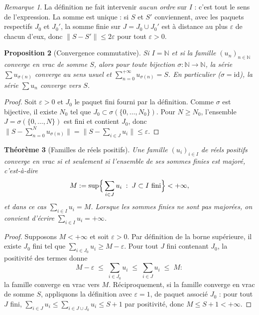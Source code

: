 \documentclass[11pt,a4paper]{article}
\theoremstyle{plain}
\newtheorem{theoreme}{Théorème}[section]
\newtheorem{proposition}[theoreme]{Proposition}
\theoremstyle{definition}
\theoremstyle{remark}
\newtheorem{remarque}[theoreme]{Remarque}
\newcommand{\N}{\mathbb{N}}
\newcommand{\eps}{\varepsilon}
\numberwithin{equation}{section}
\begin{document}
\begin{remarque}
La définition ne fait intervenir \emph{aucun ordre} sur $I$ : c'est tout le
sens de l'expression. La somme est unique : si $S$ et $S'$ conviennent,
avec les paquets respectifs $J_0$ et $J_0'$, la somme finie sur
$J=J_0\cup J_0'$ est à distance au plus $\eps$ de chacun d'eux, donc
$\lVert S-S'\rVert\leq 2\eps$ pour tout $\eps>0$.
\end{remarque}

\begin{proposition}[Convergence commutative]\label{prop:commutative}
Si $I=\N$ et si la famille $(u_n)_{n\in\N}$ converge en vrac de somme $S$,
alors pour \emph{toute} bijection $\sigma:\N\to\N$, la série
$\sum u_{\sigma(n)}$ converge au sens usuel et
$\sum_{n=0}^{+\infty}u_{\sigma(n)}=S$. En particulier
($\sigma=\mathrm{id}$), la série $\sum u_n$ converge vers $S$.
\end{proposition}

\begin{proof}
Soit $\eps>0$ et $J_0$ le paquet fini fourni par la définition. Comme
$\sigma$ est bijective, il existe $N_0$ tel que
$J_0\subset\sigma(\{0,\dots,N_0\})$. Pour $N\geq N_0$, l'ensemble
$J=\sigma(\{0,\dots,N\})$ est fini et contient $J_0$, donc
$\bigl\lVert S-\sum_{n=0}^{N}u_{\sigma(n)}\bigr\rVert
=\bigl\lVert S-\sum_{i\in J}u_i\bigr\rVert\leq\eps$.
\end{proof}

\begin{theoreme}[Familles de réels positifs]\label{thm:vrac-positif}
Une famille $(u_i)_{i\in I}$ de réels \emph{positifs} converge en vrac si
et seulement si l'ensemble de ses sommes finies est majoré, c'est-à-dire
\[
M:=\sup\Bigl\{\,\sum_{i\in J}u_i \;:\; J\subset I \text{ fini}\Bigr\}
<+\infty ,
\]
et dans ce cas $\sum_{i\in I}u_i=M$. Lorsque les sommes finies ne sont pas
majorées, on convient d'écrire $\sum_{i\in I}u_i=+\infty$.
\end{theoreme}

\begin{proof}
Supposons $M<+\infty$ et soit $\eps>0$. Par définition de la borne
supérieure, il existe $J_0$ fini tel que $\sum_{i\in J_0}u_i\geq M-\eps$.
Pour tout $J$ fini contenant $J_0$, la positivité des termes donne
\[
M-\eps\;\leq\;\sum_{i\in J_0}u_i\;\leq\;\sum_{i\in J}u_i\;\leq\;M :
\]
la famille converge en vrac vers $M$. Réciproquement, si la famille
converge en vrac de somme $S$, appliquons la définition avec $\eps=1$, de
paquet associé $J_0$ : pour tout $J$ fini,
$\sum_{i\in J}u_i\leq\sum_{i\in J\cup J_0}u_i\leq S+1$ par positivité,
donc $M\leq S+1<+\infty$.
\end{proof}
\end{document}
